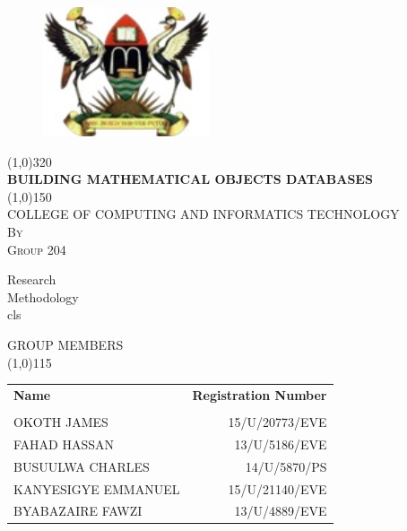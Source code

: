 \documentclass{article}
\begin{document}
\begin{titlepage}
	\begin{figure}
		\centering
		\includegraphics[height=1.5in]{muk.jpg}
	\end{figure}
	\begin{center}
		\line(1,0){320}\\
		[0.25in]
		\huge{\bfseries BUILDING MATHEMATICAL OBJECTS DATABASES}\\
		[2mm]
		\line(1,0){150}\\
		[1.2cm]
		\textsc{\large COLLEGE OF COMPUTING AND INFORMATICS TECHNOLOGY}\\
		[0.5cm]
		\textsc{\large By}\\
		[0.5cm]
		\textsc{\large Group 204}\\
		[4cm]
	\end{center}
	\begin{flushright}
	    Research\\
		Methodology\\
		cls\\
	\end{flushright}
\end{titlepage}
\thispagestyle{empty}
\centering
	\textsc{\large GROUP MEMBERS} \\
	\line(1,0){115}\\
	[0.25in]
\begin{table}[H]
	\centering
	\label{Tab:GroupMembers}
	\begin{tabular}{lr}
		\bfseries{Name} & \bfseries{Registration Number} \\ \\ 
		OKOTH JAMES         & 15/U/20773/EVE \\
		FAHAD HASSAN        & 13/U/5186/EVE \\
		BUSUULWA CHARLES    & 14/U/5870/PS \\   
		KANYESIGYE EMMANUEL & 15/U/21140/EVE \\
		BYABAZAIRE FAWZI    & 13/U/4889/EVE\\
	\end{tabular}
\end{table}
\newpage
\thispagestyle{empty}
\cleardoublepage
\setcounter{page}{1}
\end{document}
